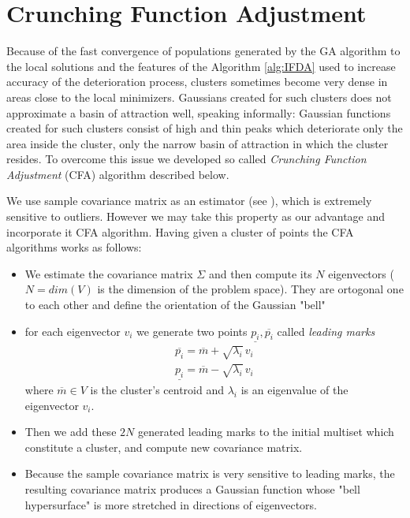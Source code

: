 \section{Crunching Function Adjustment}
\label{sec:CrumchAdj}


Because of the fast convergence of populations
generated by the GA algorithm to the local solutions 
and the features of the Algorithm \ref{alg:IFDA} used
to increase accuracy of the deterioration process, %
clusters sometimes become very dense in areas close to the local minimizers. 
Gaussians created for such
clusters does not approximate a basin of attraction well, speaking informally:
Gaussian functions created for such clusters consist of high and thin peaks
which deteriorate only the area inside the cluster, 
only the narrow basin of attraction
in which the cluster resides.
To overcome this issue we developed so called \textit{Crunching Function
Adjustment} (CFA) algorithm described below.


We use sample covariance matrix as an estimator (see \cite{SampleCovariance}), which
is extremely sensitive to outliers. However we may take this property as our
advantage and incorporate it CFA algorithm. 
Having given a cluster of points the CFA algorithms works as follows:

\begin{itemize}

  \item We estimate the covariance matrix $\Sigma$ 
  and then compute its $N$ eigenvectors
  ($N = dim(V)$ is the dimension of the problem space). 
  They are ortogonal one to each other
  and define the orientation of the Gaussian "bell"
  
  \item for each eigenvector $v_i$ we generate two points 
  $\underline{p_i}, \overline{p_i}$ called \textit{leading marks}
  \begin{eqnarray}
  \label{eqn:outliners}
  \overline{p_i} = \overline{m} + \sqrt{\lambda_i} \, v_i \nonumber\\
  \underline{p_i} = \overline{m} - \sqrt{\lambda_i}\, v_i
  \end{eqnarray} 
  where $\overline{m} \in V$ is the cluster's centroid and $\lambda_i$ is
  an eigenvalue of the eigenvector $v_i$.
  
  \item Then we add these $2 N$ generated leading marks to the initial
  multiset which constitute a cluster, and compute new covariance matrix.
  
  \item Because the sample covariance matrix is very sensitive to leading marks,
  the resulting covariance matrix produces a Gaussian function whose "bell
  hypersurface" is more stretched in directions of eigenvectors.
  
  \end{itemize}
  
